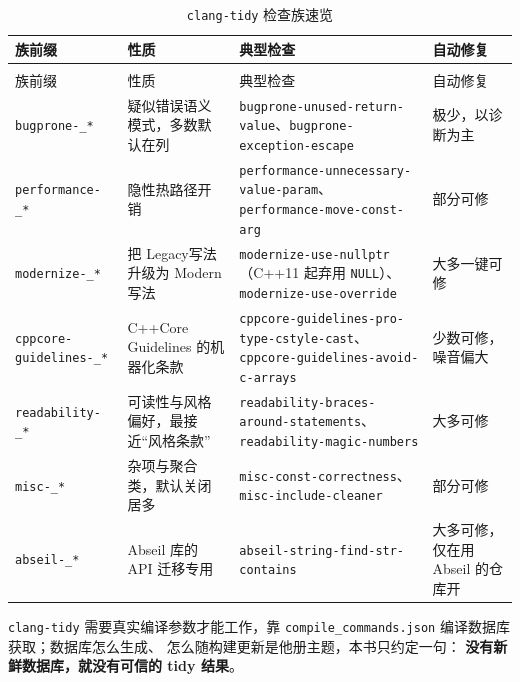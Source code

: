 \documentclass[12pt,a4paper,fontset=fandol]{ctexbook}
\newcommand{\cpp}[1]{C++#1}
\newcommand{\Tp}[1]{\texttt{#1}}
\newcommand{\Bk}{\discretionary{}{}{}}
\newcommand{\Lang}[1]{\textsf{#1}}
\newcommand{\CPP}{\Lang{C++}}
\newcommand{\DomMod}{\Lang{Modern}}
\newcommand{\DomTra}{\Lang{Legacy}}
\begin{document}
{\small\begin{longtable}{>{\raggedright\arraybackslash}p{}
                  >{\raggedright\arraybackslash}p{}
                  >{\raggedright\arraybackslash}p{}
                  >{\raggedright\arraybackslash}p{}}
\caption{\Tp{clang-tidy} 检查族速览}\label{tab:ch13-families}\\
\toprule
族前缀 & 性质 & 典型检查 & 自动修复 \\
\midrule
\endfirsthead
\multicolumn{4}{r}{（接表 \ref{tab:ch13-families}）}\\
\toprule
族前缀 & 性质 & 典型检查 & 自动修复 \\
\midrule
\endhead
\Tp{bugprone-\allowbreak \_*} & 疑似错误语义模式，多数默认在列 &
  \Tp{bugprone-\allowbreak unused-\allowbreak return-value}、\Tp{bugprone-\allowbreak exception-\allowbreak escape} &
  极少，以诊断为主 \\
\addlinespace
\Tp{performance-\allowbreak \_*} & 隐性热路径开销 &
  \Tp{performance-\allowbreak unnecessary-\allowbreak value-\allowbreak param}、
  \Tp{performance-\allowbreak move-\allowbreak const-arg} & 部分可修 \\
\addlinespace
\Tp{modernize-\allowbreak \_*} & 把 \DomTra 写法升级为 \DomMod 写法 &
  \Tp{modernize-\allowbreak use-nullptr}（\cpp{11} 起弃用 \Tp{NULL}）、
  \Tp{modernize-\allowbreak use-\allowbreak override} & 大多一键可修 \\
\addlinespace
\Tp{cppcore-\allowbreak guidelines-\allowbreak \_*} & \CPP Core Guidelines 的机器化条款 &
  \Tp{cppcore-\allowbreak guidelines-pro-type-\allowbreak cstyle-\allowbreak cast}、
  \Tp{cppcore-\allowbreak guidelines-avoid-c-\allowbreak arrays} & 少数可修，噪音偏大 \\
\addlinespace
\Tp{readability-\allowbreak \_*} & 可读性与风格偏好，最接近``风格条款'' &
  \Tp{readability-\allowbreak braces-around-\allowbreak statements}、
  \Tp{readability-\allowbreak magic-numbers} & 大多可修 \\
\addlinespace
\Tp{misc-\allowbreak \_*} & 杂项与聚合类，默认关闭居多 &
  \Tp{misc-const-\allowbreak correctness}、\Tp{misc-include-cleaner} & 部分可修 \\
\addlinespace
\Tp{abseil-\allowbreak \_*} & Abseil 库的 API 迁移专用 &
  \Tp{abseil-string-\allowbreak find-str-\allowbreak contains} & 大多可修，仅在用 Abseil 的仓库开 \\
\bottomrule
\end{longtable}}

\Tp{clang-tidy} 需要真实编译参数才能工作，靠
\Tp{compile\_commands{\Bk}.json} 编译数据库获取；数据库怎么生成、
怎么随构建更新是他册主题，本书只约定一句：
\textbf{没有新鲜数据库，就没有可信的 tidy 结果}。
\end{document}

